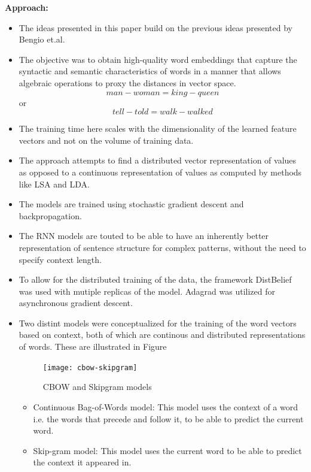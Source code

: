 \documentclass[11pt,a4paper]{article}
\begin{document}
  \textbf{Approach:}
  \begin{itemize}
    \item 
    The ideas presented in this paper build on the previous ideas presented by Bengio et.al.\cite{bengio2003neural}
    \item 
    The objective was to obtain high-quality word embeddings that capture the syntactic and semantic characteristics of words in a manner that allows algebraic operations to proxy the distances in vector space.
    $$man - woman = king - queen$$ or $$tell - told = walk - walked$$
    \item 
    The training time here scales with the dimensionality of the learned feature vectors and not on the volume of training data.
    \item 
    The approach attempts to find a distributed vector representation of values as opposed to a continuous representation of values as computed by methods like LSA and LDA.
    \item 
    The models are trained using stochastic gradient descent and backpropagation.
    \item 
    The RNN models are touted to be able to have an inherently better representation of sentence structure for complex patterns, without the need to specify context length.
    \item 
    To allow for the distributed training of the data, the framework DistBelief was used with mutiple replicas of the model. Adagrad was utilized for asynchronous gradient descent.
    \item 
    Two distint models were conceptualized for the training of the word vectors based on context, both of which are continous and distributed representations of words. These are illustrated in Figure
    \begin{figure}[ht]
      \centering
      \texttt{[image: cbow-skipgram]}
      \caption{CBOW and Skipgram models}
      \label{fig:cbow-skipgram}
    \end{figure}
    \begin{itemize}
      \item 
      Continuous Bag-of-Words model: This model uses the context of a word i.e. the words that precede and follow it, to be able to predict the current word.
      \item 
      Skip-gram model: This model uses the current word to be able to predict the context it appeared in.
    \end{itemize}
  \end{itemize}
\end{document}
